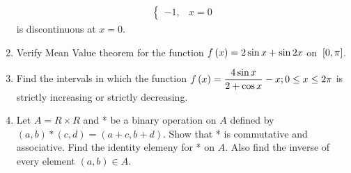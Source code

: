 \begin{enumerate}
\begin{align*}
\begin{cases}
		-1 , & x = 0
		\end{cases}
	\end{align*}
is discontinuous at $x=0$.
\item Verify Mean Value theorem for the function $f\left(x\right) = 2\sin{x} + \sin{2x}$ on ${}\left[0,\pi\right]$.
\item Find the intervals in which the function $f\left(x\right) = \dfrac{4\sin x}{2 + \cos x} - x; 0 \leq x \leq 2\pi$ is strictly increasing or strictly decreasing.
\item Let $A=R\times R$ and * be a binary operation on $A$ defined by $(a,b)*(c,d) = (a+c,b+d)$.
Show that * is commutative and associative. Find the identity elemeny for * on $A$. Also find the inverse of every element $(a, b) \in A$.

\end{enumerate}
